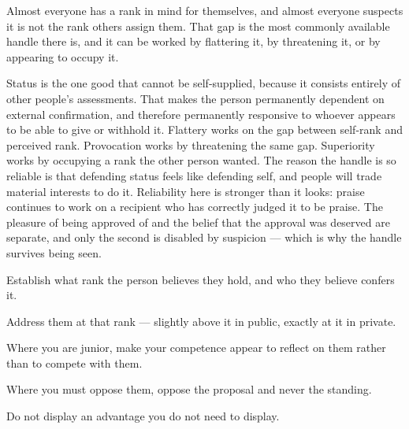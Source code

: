 


\begin{core}
Almost everyone has a rank in mind for themselves, and almost everyone suspects it is not the rank others assign them. That gap is the most commonly available handle there is, and it can be worked by flattering it, by threatening it, or by appearing to occupy it.
\end{core}

\begin{mechanism}
Status is the one good that cannot be self-supplied, because it consists entirely of other people's assessments. That makes the person permanently dependent on external confirmation, and therefore permanently responsive to whoever appears to be able to give or withhold it. Flattery works on the gap between self-rank and perceived rank. Provocation works by threatening the same gap. Superiority works by occupying a rank the other person wanted. The reason the handle is so reliable is that defending status feels like defending self, and people will trade material interests to do it. Reliability here is stronger than it looks: praise continues to work on a recipient who has correctly judged it to be praise. The pleasure of being approved of and the belief that the approval was deserved are separate, and only the second is disabled by suspicion --- which is why the handle survives being seen.
\end{mechanism}

\begin{application}
  \item Establish what rank the person believes they hold, and who they believe confers it.
  \item Address them at that rank --- slightly above it in public, exactly at it in private.
  \item Where you are junior, make your competence appear to reflect on them rather than to compete with them.
  \item Where you must oppose them, oppose the proposal and never the standing.
  \item Do not display an advantage you do not need to display.
\end{application}

